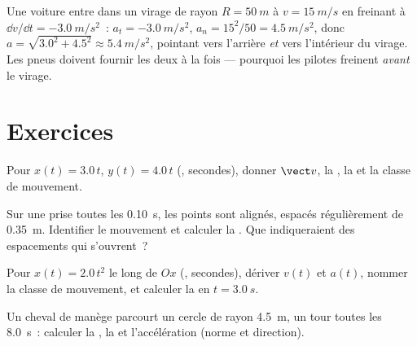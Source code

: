 \begin{example}\label{ex:g12:kinematics-2d:bend}
Une voiture entre dans un virage de rayon $R = \qty{50}{m}$ à
$v = \qty{15}{m/s}$ en freinant à $\dd v/\dd t = \qty{-3.0}{m/s^2}$~:
$a_t = \qty{-3.0}{m/s^2}$, $a_n = 15^2/50 = \qty{4.5}{m/s^2}$, donc
$a = \sqrt{3.0^2 + 4.5^2} \approx \qty{5.4}{m/s^2}$, pointant vers
l'arrière \emph{et} vers l'intérieur du virage. Les pneus doivent
fournir les deux à la fois --- pourquoi les pilotes freinent
\emph{avant} le virage.
\end{example}

\section{Exercices}

\begin{exercise}[$\star$]\label{exo:g12:kinematics-2d:1}
Pour $x(t) = 3.0\,t$, $y(t) = 4.0\,t$ (, secondes), donner
$\vect v$, la , la  et la classe de
mouvement.
\end{exercise}

\begin{exercise}[$\star$]\label{exo:g12:kinematics-2d:2}
Sur une  prise toutes les \qty{0.10}{s},
les points sont alignés, espacés régulièrement de \qty{0.35}{m}.
Identifier le mouvement et calculer la . Que
indiqueraient des espacements qui s'ouvrent~?
\end{exercise}

\begin{exercise}[$\star$]\label{exo:g12:kinematics-2d:3}
Pour $x(t) = 2.0\,t^2$ le long de $Ox$ (, secondes), dériver
$v(t)$ et $a(t)$, nommer la classe de mouvement, et calculer la
 en $t = \qty{3.0}{s}$.
\end{exercise}

\begin{exercise}[$\star$]\label{exo:g12:kinematics-2d:4}
Un cheval de manège parcourt un cercle de rayon \qty{4.5}{m}, un tour
toutes les \qty{8.0}{s}~: calculer la , la
 et l'accélération (norme et direction).
\end{exercise}

